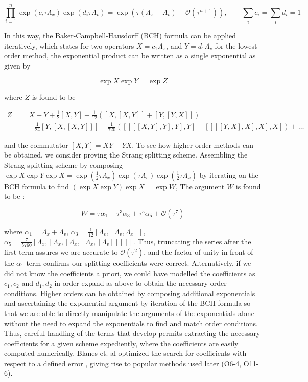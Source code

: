 \documentclass[11pt,titlepage]{report}
\begin{document}
\begin{equation}\prod_{i = 1}^n \exp (c_i\tau \Lambda_x)\exp (d_i\tau \Lambda_v) = \exp (\tau (\Lambda_x + \Lambda_v) + \mathcal{O}(\tau^{n+1})), \qquad \sum_i c_i = \sum_i d_i = 1\label{eq:nth_order_scheme_exp}\end{equation}

\noindent In this way, the Baker-Campbell-Hausdorff (BCH) formula can be applied iteratively, which states for two operators $X = c_1\Lambda_x$, and $Y = d_1\Lambda_v$ for the lowest order method, the exponential product can be written as a single exponential as given by

$$\exp X \exp Y = \exp Z$$

where $Z$ is found to be 

\begin{eqnarray*}
Z & = & X + Y + \frac{1}{2}[X,Y] + \frac{1}{12}([X,[X,Y]] + [Y,[Y,X]]) \\[0.5em]
&&  - \frac{1}{24}[Y,[X,[X,Y]]] - \frac{1}{720}([[[[X,Y],Y],Y],Y] + [[[[Y,X],X],X],X]) + \ldots
\end{eqnarray*}

\noindent and the commutator $[X,Y] = XY - YX$.  To see how higher order methods can be obtained, we consider proving the Strang splitting scheme. Assembling the Strang splitting scheme by composing $\exp X \exp Y \exp X = \exp (\tfrac{1}{2}\tau \Lambda_x) \exp (\tau \Lambda_v) \exp (\tfrac{1}{2}\tau \Lambda_x)$ by iterating on the BCH formula to find $(\exp X \exp Y)\exp X = \exp W$, The argument $W$ is found to be \cite{Yoshida90}:

$$W = \tau \alpha_1 + \tau^3 \alpha_3 + \tau^5 \alpha_5 + \mathcal{O}(\tau^7)$$

\noindent where $\alpha_1 = \Lambda_x + \Lambda_v$, $\alpha_3 = \tfrac{1}{12}[\Lambda_v,[\Lambda_v,\Lambda_x]]$, $\alpha_5 = \tfrac{7}{5760}[\Lambda_x,[\Lambda_x,[\Lambda_x,[\Lambda_x,[\Lambda_v]]]]]$. Thus, truncating the series after the first term assures we are accurate to $\mathcal{O}(\tau^2)$, and the factor of unity in front of the $\alpha_1$ term confirms our splitting coefficients were correct. Alternatively, if we did not know the coefficients a priori, we could have modelled the coefficients as $c_1, c_2$ and $d_1, d_2$ in order expand as above to obtain the necessary order conditions. Higher orders can be obtained by composing additional exponentials and ascertaining the exponential argument by iteration of the BCH formula so that we are able to directly manipulate the arguments of the exponentials alone without the need to expand the exponentials to find and match order conditions. Thus, careful handling of the terms that develop permits extracting the necessary coefficients for a given scheme expediently, where the coefficients are easily computed numerically. Blanes et. al optimized the search for coefficients with respect to a defined error \cite{Blanes02}, giving rise to popular methods used later (O6-4, O11-6).
\end{document}
